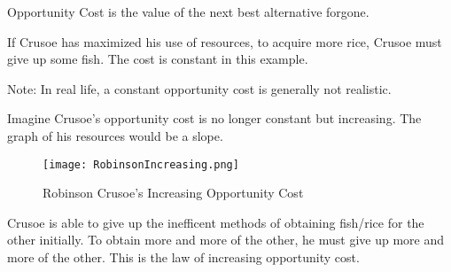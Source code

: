 \begin{definition}
    Opportunity Cost is the value of the next best alternative forgone.
    \begin{example}
    If Crusoe has maximized his use of resources, to acquire more rice, Crusoe must give up some fish.
    The cost is constant in this example.
    \end{example}
    Note: In real life, a constant opportunity cost is generally not realistic.
\end{definition}
\newpage
Imagine Crusoe's opportunity cost is no longer constant but increasing.
The graph of his resources would be a slope.\\
\begin{figure}[h!]
    \centering
    \texttt{[image: RobinsonIncreasing.png]}
    \caption{Robinson Crusoe's Increasing Opportunity Cost}
\end{figure}
Crusoe is able to give up the inefficent methods of obtaining fish/rice for the other initially.
To obtain more and more of the other, he must give up more and more of the other. This is the law of increasing opportunity cost.
